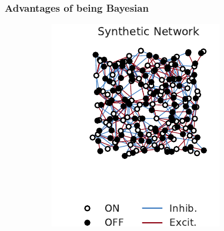 \subsubsection{Advantages of being Bayesian}
\label{sec:advantages}
\begin{figure}[t!]
  \centering
  \vspace{-.2in}
  \begin{subfigure}[b]{1.8in}
    \centering
    \caption{}
    \vspace{-.25in}
    \includegraphics[width=\textwidth]{figures/ch3/synth_rgc_true_network.pdf}
    \label{fig:synth_rgc_true_network}
  \end{subfigure}
  ~
  \begin{subfigure}[b]{1.8in}
    \centering
    \caption{}
    \vspace{-.25in}

\end{subfigure}
\end{figure}
